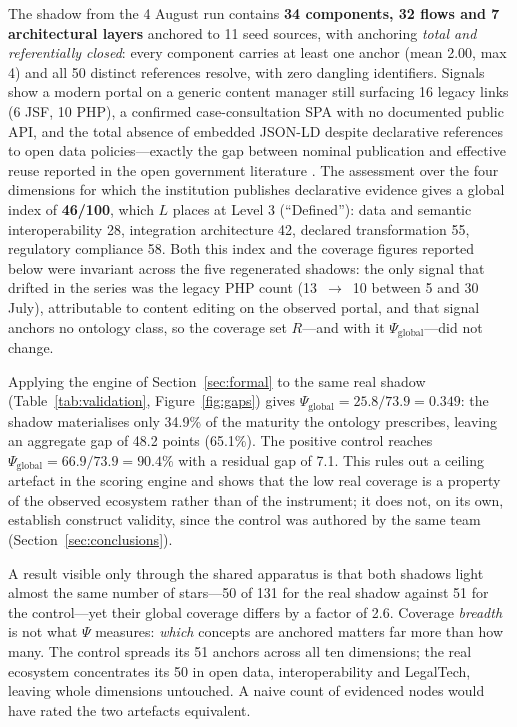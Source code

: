 \documentclass[engproc,proceedingpaper,submit,moreauthors]{Definitions/mdpi}
\begin{document}
    
    The shadow from the 4 August run contains \textbf{34 components, 32 flows and 7 architectural layers} anchored to 11 seed sources, with anchoring \emph{total and referentially closed}: every component carries at least one anchor (mean 2.00, max 4) and all 50 distinct references resolve, with zero dangling identifiers. Signals show a modern portal on a generic content manager still surfacing 16 legacy links (6 JSF, 10 PHP), a confirmed case-consultation SPA with no documented public API, and the total absence of embedded JSON-LD despite declarative references to open data policies---exactly the gap between nominal publication and effective reuse reported in the open government literature \cite{Janssen2012,Attard2015}. The assessment over the four dimensions for which the institution publishes declarative evidence gives a global index of \textbf{46/100}, which $L$ places at Level 3 (``Defined''): data and semantic interoperability 28, integration architecture 42, declared transformation 55, regulatory compliance 58. Both this index and the coverage figures reported below were invariant across the five regenerated shadows: the only signal that drifted in the series was the legacy PHP count (13~$\rightarrow$~10 between 5 and 30 July), attributable to content editing on the observed portal, and that signal anchors no ontology class, so the coverage set $R$---and with it $\Psi_{\mathrm{global}}$---did not change.

    Applying the engine of Section~\ref{sec:formal} to the same real shadow (Table~\ref{tab:validation}, Figure~\ref{fig:gaps}) gives $\Psi_{\mathrm{global}}=25.8/73.9=\mathbf{0.349}$: the shadow materialises only 34.9\% of the maturity the ontology prescribes, leaving an aggregate gap of 48.2 points (65.1\%). The positive control reaches $\Psi_{\mathrm{global}}=66.9/73.9=90.4\%$ with a residual gap of 7.1. This rules out a ceiling artefact in the scoring engine and shows that the low real coverage is a property of the observed ecosystem rather than of the instrument; it does not, on its own, establish construct validity, since the control was authored by the same team (Section~\ref{sec:conclusions}).

    A result visible only through the shared apparatus is that both shadows light almost the same number of stars---50 of 131 for the real shadow against 51 for the control---yet their global coverage differs by a factor of 2.6. Coverage \emph{breadth} is not what $\Psi$ measures: \emph{which} concepts are anchored matters far more than how many. The control spreads its 51 anchors across all ten dimensions; the real ecosystem concentrates its 50 in open data, interoperability and LegalTech, leaving whole dimensions untouched. A naive count of evidenced nodes would have rated the two artefacts equivalent.
\end{document}
